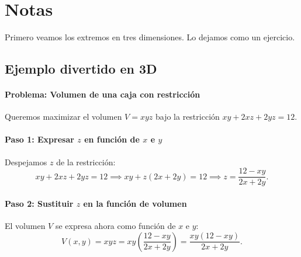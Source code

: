 \documentclass[11pt]{book}
\theoremstyle{definicion}
\theoremstyle{teorema}
\theoremstyle{ejemplo}
\begin{document}
\section{Notas}

\noindent
Primero veamos los extremos en tres dimensiones. Lo dejamos como un ejercicio.

\subsection{Ejemplo divertido en 3D}



\paragraph{Problema: Volumen de una caja con restricción}
%
Queremos maximizar el volumen \( V = xyz \) bajo la restricción \( xy + 2xz + 2yz = 12 \).

\paragraph{Paso 1: Expresar \( z \) en función de \( x \) e \( y \)}
Despejamos \( z \) de la restricción:
\[
xy + 2xz + 2yz = 12 \implies xy + z( 2x + 2y) = 12 \implies z = \frac{12-xy}{ 2x + 2y}.
\] 

\paragraph{Paso 2: Sustituir \( z \) en la función de volumen}

El volumen \( V \) se expresa ahora como función de \( x \) e \( y \):
\[
V(x, y) = xyz = xy \left( \frac{12-xy}{2x + 2y} \right) = \frac{xy(12-xy)}{2x + 2y}.
\]



%
\end{document}
